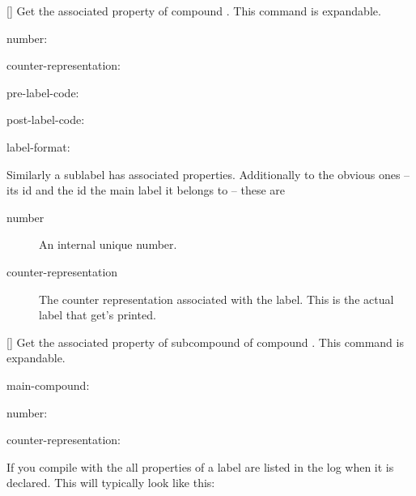 \documentclass[load-preamble+,babel-options={ngerman,british,american}]{cnltx-doc}
\begin{document}
\begin{commands}
  \expandable{}[]
    Get the associated property  of compound .  This
    command is expandable.
\end{commands}

\begin{example}
  \def\expandfull{\romannumeral-`0}%
  \def\expandtwice{\detokenize\expandafter\expandafter\expandafter}%
  \ttfamily
  number: \par
  counter-representation: \par
  pre-label-code: \par %
  post-label-code: \par %
  label-format: \expandtwice{\expandfull\cmpdproperty{benzene}{label-format}}
\end{example}

Similarly a sublabel has associated properties.  Additionally to the obvious
ones -- its \acs{id} and the \acs{id} the main label it belongs to -- these
are
\begin{description}
  \item[number] An internal unique number.
  \item[counter-representation] The counter representation associated with the
    label.  This is the actual label that get's printed.
\end{description}

\begin{commands}
  \expandable{}[]
    Get the associated property  of subcompound  of compound .  This command is
    expandable.
\end{commands}

\begin{example}
  \ttfamily
  main-compound: \par
  number: \par
  counter-representation: 
\end{example}

If you compile with the  all properties of a label are
listed in the log when it is declared.  This will typically look like this:
\end{document}
